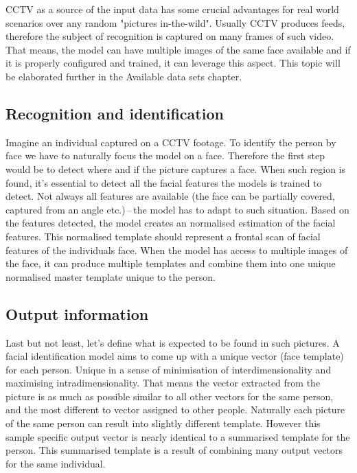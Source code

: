 CCTV as a source of the input data has some crucial advantages for real world scenarios over any random "pictures in-the-wild". Usually CCTV produces feeds, therefore the subject of recognition is captured on many frames of such video. That means, the model can have multiple images of the same face available and if it is properly configured and trained, it can leverage this aspect. This topic will be elaborated further in the Available data sets chapter.

\subsection{Recognition and identification}

Imagine an individual captured on a CCTV footage. To identify the person by face we have to naturally focus the model on a face. Therefore the first step would be to detect where and if the picture captures a face. When such region is found, it's essential to detect all the facial features the models is trained to detect. Not always all features are available (the face can be partially covered, captured from an angle etc.)\,--\,the model has to adapt to such situation. Based on the features detected, the model creates an normalised estimation of the facial features. This normalised template should represent a frontal scan of facial features of the individuals face. When the model has access to multiple images of the face, it can produce multiple templates and combine them into one unique normalised master template unique to the person.

\subsection{Output information}

Last but not least, let's define what is expected to be found in such pictures. A facial identification model aims to come up with a unique vector (face template) for each person. Unique in a sense of minimisation of interdimensionality and maximising intradimensionality. That means the vector extracted from the picture is as much as possible similar to all other vectors for the same person, and the most different to vector assigned to other people. Naturally each picture of the same person can result into slightly different template. However this sample specific output vector is nearly identical to a summarised template for the person. This summarised template is a result of combining many output vectors for the same individual.
